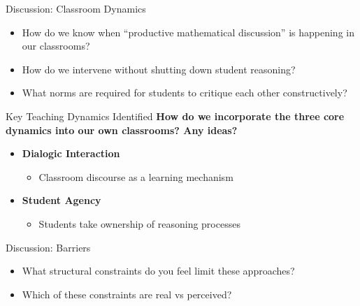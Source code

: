 \documentclass[dvipsnames]{beamer}
\begin{document}

\begin{frame}{Discussion: Classroom Dynamics}
\begin{itemize}
    \item How do we know when “productive mathematical discussion” is happening in our classrooms?
    \item How do we intervene without shutting down student reasoning?
    \item What norms are required for students to critique each other constructively?
\end{itemize}
\end{frame}
\begin{frame}{Key Teaching Dynamics Identified}
\textbf{How do we incorporate the three core dynamics into our own classrooms? Any ideas?}

\begin{itemize}
    \textbf{Knowledge Socialization}
    \begin{itemize}
        \item Students articulate and negotiate meaning
    \end{itemize}
    
    \item \textbf{Dialogic Interaction}
    \begin{itemize}
        \item Classroom discourse as a learning mechanism
    \end{itemize}
    
    \item \textbf{Student Agency}
    \begin{itemize}
        \item Students take ownership of reasoning processes
    \end{itemize}
\end{itemize}
\end{frame}

\begin{frame}{Discussion: Barriers}
\begin{itemize}
    \item What structural constraints do you feel limit these approaches?
    \item Which of these constraints are real vs perceived?
\end{itemize}
\end{frame}
\end{document}
